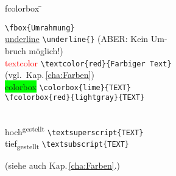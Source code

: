 {\small
\begin{tabbing}

fcolorbox\hspace{2ex}	\= \kill%
	
		\> \lstinline|\fbox{Umrahmung}|
	\\
	\underline{underline} 	\> 
	\lstinline|\underline{}| 
	(ABER: Kein Um- \\ \> bruch möglich!) 
	\\
	
	\textcolor{red}{textcolor} \> \lstinline|\textcolor{red}{Farbiger Text}| 
	\\ \> (vgl.\, Kap.\,\ref{cha:Farben})
	\\
	
	\colorbox{lime}{colorbox} \> \lstinline|\colorbox{lime}{TEXT}|
	\\
		
	 \> \lstinline|\fcolorbox{red}{lightgray}{TEXT}|
	
	\\
	hoch\textsuperscript{gestellt}	\> \lstinline|\textsuperscript{TEXT}|
	\\
	tief\textsubscript{gestellt}		\> \lstinline|\textsubscript{TEXT}|
	
\end{tabbing}
}
\noindent(siehe auch Kap.\,\ref{cha:Farben}.)


